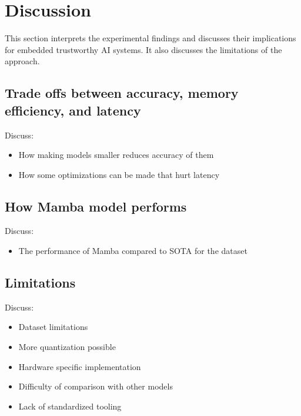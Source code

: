 \section{Discussion}
\label{sec:discussion}

This section interprets the experimental findings and discusses their implications for embedded trustworthy AI systems. It also discusses the limitations of the approach.

\subsection{Trade offs between accuracy, memory efficiency, and latency}

Discuss:
\begin{itemize}
  \item How making models smaller reduces accuracy of them
  \item How some optimizations can be made that hurt latency
\end{itemize}

\subsection{How Mamba model performs}

Discuss:
\begin{itemize}
  \item The performance of Mamba compared to SOTA for the dataset
\end{itemize}

\subsection{Limitations}

Discuss:
\begin{itemize}
  \item Dataset limitations
  \item More quantization possible
  \item Hardware specific implementation
  \item Difficulty of comparison with other models
  \item Lack of standardized tooling
\end{itemize}

